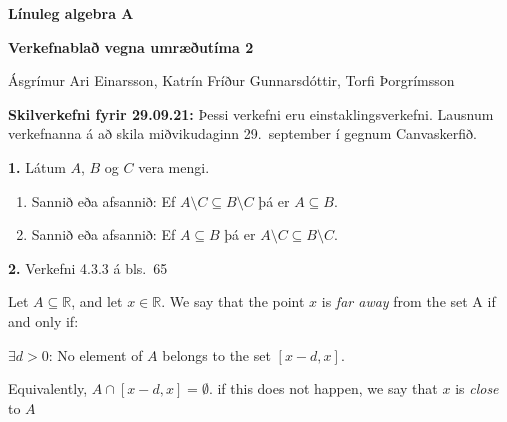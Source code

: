 \documentclass[12pt]{article}
\begin{document}
\pagestyle{empty}


\newcommand{\Ov}{\mbox{${\bf 0}$}}
\newcommand{\rv}{\mbox{${\bf r}$}}
\newcommand{\vv}{\mbox{${\bf v}$}}
\newcommand{\xv}{\mbox{${\bf x}$}}
\newcommand{\yv}{\mbox{${\bf y}$}}
\newcommand{\av}{\mbox{${\bf a}$}}
\newcommand{\bv}{\mbox{${\bf b}$}}
\newcommand{\cv}{\mbox{${\bf c}$}}
\newcommand{\iv}{\mbox{${\bf i}$}}
\newcommand{\jv}{\mbox{${\bf j}$}}
\newcommand{\kv}{\mbox{${\bf k}$}}

\newcommand{\ZZ}{\mbox{$\mathbb{Z}$}}
\newcommand{\NN}{\mbox{$\mathbb{N}$}}
\newcommand{\QQ}{\mbox{$\mathbb{Q}$}}
\newcommand{\RR}{\mbox{$\mathbb{R}$}}
\newcommand{\CC}{\mbox{$\mathbb{C}$}}

\newcommand{\RRk}{\mbox{$\mathbb{R}^k$}}
\newcommand{\RRn}{\mbox{$\mathbb{R}^n$}}
\newcommand{\RRm}{\mbox{$\mathbb{R}^m$}}

\centerline{\bf \Huge Línuleg algebra A}
\medskip
\centerline{\bf \Large Verkefnablað vegna umræðutíma 2}

\medskip

\begin{center}
	Ásgrímur Ari Einarsson,  Katrín Fríður Gunnarsdóttir, Torfi Þorgrímsson
\end{center}

\bigskip
{\bf Skilverkefni fyrir 29.09.21:}  Þessi verkefni eru einstaklingsverkefni.  Lausnum verkefnanna á að skila miðvikudaginn 29.~september  í gegnum Canvaskerfið.

\smallskip

{\bf 1.}  Látum $A$, $B$ og $C$ vera mengi.  

\begin{enumerate}[label=(\alph*)]
	\item Sannið eða afsannið:  Ef $A\setminus C\subseteq B\setminus C$ þá er $A\subseteq B$.
	\item Sannið eða afsannið:  Ef $A\subseteq B$ þá er $A\setminus C\subseteq B\setminus C$.
\end{enumerate}

\smallskip

{\bf 2.}  Verkefni 4.3.3 á bls.~65

Let $A\subseteq \mathbb{R}$, and let $x\in \mathbb{R}$. We say that the point $x$ is \emph{far away} from the set A if and only if:

\qquad \qquad $\exists d >0$: No element of $A$ belongs to the set $[x-d,x]$.

Equivalently, $A\cap [x-d,x]=\emptyset $. if this does not happen, we say that $x$ is \emph{close} to $A$
\end{document}
